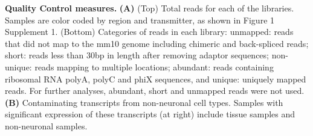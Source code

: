 \textbf{Quality Control measures.} \textbf{(A)} (Top) Total reads for each of the libraries. Samples are color coded by region and transmitter, as shown in Figure 1 Supplement 1. (Bottom) Categories of reads in each library: unmapped: reads that did not map to the mm10 genome including chimeric and back-spliced reads; short: reads less than 30bp in length after removing adaptor sequences; non-unique: reads mapping to multiple locations; abundant: reads containing ribosomal RNA polyA, polyC and phiX sequences, and unique: uniquely mapped reads. For further analyses, abundant, short and unmapped reads were not used.
\textbf{(B)} Contaminating transcripts from non-neuronal cell types. Samples with significant expression of these transcripts (at right) include tissue samples and non-neuronal samples. 
